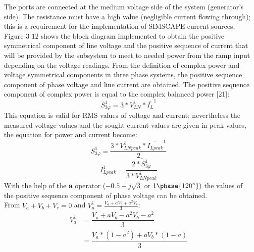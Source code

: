 The ports are connected at the medium voltage side of the system (generator’s side). The resistance must have a high value (negligible current flowing through); this is a requirement for the implementation of SIMSCAPE current sources.
Figure 3 12 shows the block diagram implemented to obtain the positive symmetrical component of line voltage and the positive sequence of current that will be provided by the subsystem to meet to needed power from the ramp input depending on the voltage readings. From the definition of complex power and voltage symmetrical components in three phase systems, the positive sequence component of phase voltage and line current are obtained. The positive sequence component of complex power is equal to the complex balanced power [21]:
\begin{equation}
S_{3\varphi}^1=3*V_{LN}^1*\bar{I_{L}}^1
\end{equation}
This equation is valid for RMS values of voltage and current; nevertheless the measured voltage values and the sought current values are given in peak values, the equation for power and current become:
\begin{equation}
S_{3\varphi}^1=\dfrac{3*V_{LNpeak}^1*\bar{I_{Lpeak}}^1}{2}
\end{equation}
\begin{equation}
I_{Lpeak}^1=\dfrac{\bar{2*S_{3\varphi}^1}}{3*V_{LNpeak}^1}
\end{equation}
With the help of the \textbf{a} operator ($-0.5+j\sqrt{3}$ or $ 1\phase{120^{\circ}}) $ the values of the positive sequence component of phase voltage can be obtained. \\
From $ V_a +V_b+V_c=0$ and $ V_a^1=\frac{V_a+ aV_b+a^2 V_c}{3} $:
\begin{align*}
	 V_a^1 & =\dfrac{V_a+ aV_b-a^2 V_b-a^2}{3} \\
	& =\dfrac{V_a*(1-a^2)+ aV_b*(1-a)}{3} 
\end{align*}

